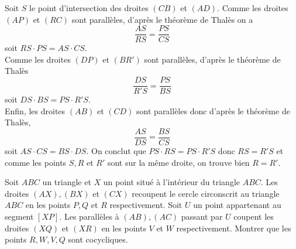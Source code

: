 \begin{sol}
\begin{center}
\end{center}

Soit $S$ le point d'intersection des droites $(CB)$ et $(AD)$. Comme les droites $(AP)$ et $(RC)$ sont parallèles, d'après le théorème de Thalès on a 
$$\frac{AS}{RS}=\frac{PS}{CS}$$ soit $RS\cdot PS=AS\cdot CS$. 
\\
Comme les droites $(DP)$ et $(BR')$ sont parallèles, d'après le théorème de Thalès 
$$\frac{DS}{R'S}=\frac{PS}{BS}$$ soit $DS\cdot BS= PS\cdot R'S$. 
\\
Enfin, les droites $(AB)$ et $(CD)$ sont parallèles donc d'après le théorème de Thalès, 
$$\frac{AS}{DS}=\frac{BS}{CS}$$ soit $AS\cdot CS=BS\cdot DS$. On conclut que $PS\cdot RS=PS\cdot R'S$ donc $RS=R'S$ et comme les points $S,R$ et $R'$ sont sur la même droite, on trouve bien $R=R'$. 
\end{sol}

\begin{exo}
Soit $ABC$ un triangle et $X$ un point situé à l'intérieur du triangle $ABC$. Les droites $(AX), (BX)$ et $(CX)$ recoupent le cercle circonscrit au triangle $ABC$ en les points $P,Q$ et $R$ respectivement. Soit $U$ un point appartenant au segment $[XP]$. Les parallèles à $(AB),(AC)$ passant par $U$ coupent les droites $(XQ)$ et $(XR)$ en les points $V$ et $W$ respectivement. Montrer que les points $R,W,V,Q$ sont cocycliques. 
\end{exo}

